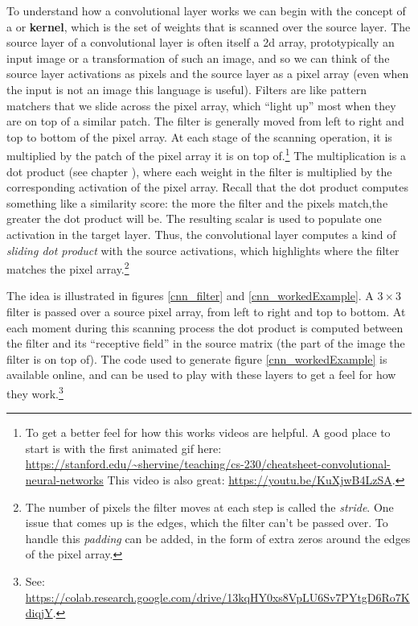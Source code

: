 To understand how a convolutional  layer works we can begin with the concept of a  or \textbf{kernel}, which is the set of weights that is scanned over the source layer. The source layer of a convolutional layer is often itself a 2d array, prototypically an input image or a transformation of such an image, and so we can think of the source layer activations as pixels and the source layer as a pixel array (even when the input is not an image this language is useful). Filters are like pattern matchers that we slide across the pixel array, which ``light up'' most when they are on top of a similar patch. The filter is generally moved from left to right and top to bottom of the pixel array. At each stage of the scanning operation, it is multiplied by the patch of the pixel array it is on top of.\footnote{To get a better feel for how this works videos are  helpful. A good place  to start is with the first animated gif here: \url{https://stanford.edu/~shervine/teaching/cs-230/cheatsheet-convolutional-neural-networks} This video is also great: \url{https://youtu.be/KuXjwB4LzSA}.}  The multiplication is a dot product (see chapter ),  where each weight in the filter is multiplied by the corresponding activation of the pixel array.  Recall that the dot product computes something like a similarity score: the more the filter and the pixels match,the greater the dot product will be. The resulting scalar is used to populate one activation in the target layer. Thus, the convolutional layer computes a kind of \emph{sliding dot product} with the source activations, which highlights where the filter matches the pixel array.\footnote{The number of pixels the filter moves at each step is called the \emph{stride}. One issue that comes up is the edges, which the filter can't be passed over. To handle this \emph{padding} can be added, in the form of extra zeros around the edges of the pixel array.}

The idea is illustrated in figures \ref{cnn_filter} and \ref{cnn_workedExample}. A $3 \times 3$ filter is passed over a source pixel array, from left to right and top to bottom. At each moment during this scanning process the dot product is computed between the filter and its ``receptive field'' in the source matrix (the part of the image the filter is on top of). The code used to generate figure \ref{cnn_workedExample} is available online, and can be used to play with these layers to get a feel for how they work.\footnote{See: \url{https://colab.research.google.com/drive/13kqHY0xs8VpLU6Sv7PYtgD6Ro7KdiqjY}.}

